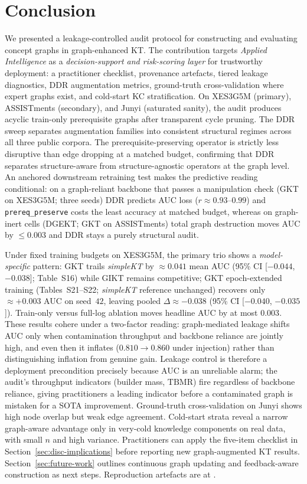 \documentclass[pdflatex,sn-mathphys-num]{sn-jnl}
\newcommand{\KCs}{knowledge components}
\newcommand{\DDR}{\textsc{DDR}}
\newcommand{\GKTdeltaci}{[$-0.044$, $-0.038$]}
\newcommand{\GKTthirtydeltavec}{-0.038}
\newcommand{\GKTthirtydeltaci}{[$-0.040$, $-0.035$]}
\newcommand{\GKTepochgain}{+0.003}
\begin{document}
\section{Conclusion}
\label{sec:concl}
We presented a leakage-controlled audit protocol for constructing and
evaluating concept graphs in graph-enhanced KT. The contribution targets
\textit{Applied Intelligence} as a \emph{decision-support and risk-scoring
layer} for trustworthy deployment: a
practitioner checklist, provenance artefacts, tiered leakage diagnostics,
\DDR{} augmentation metrics, ground-truth cross-validation where expert graphs
exist, and cold-start KC stratification. On XES3G5M (primary), ASSISTments (secondary), and Junyi (saturated sanity),
the audit produces acyclic train-only prerequisite graphs after transparent
cycle pruning. The \DDR{} sweep separates augmentation families into
consistent structural regimes across all three public corpora. The
prerequisite-preserving operator is strictly less disruptive than edge dropping
at a matched budget, confirming that \DDR{} separates structure-aware from
structure-agnostic operators at the graph level. An anchored downstream
retraining test makes the predictive reading conditional: on a graph-reliant
backbone that passes a manipulation check (GKT on XES3G5M; three seeds) \DDR{} predicts AUC
loss ($r{\approx}0.93$--$0.99$) and \texttt{prereq\_preserve} costs the least accuracy at
matched budget, whereas on graph-inert cells (DGEKT; GKT on ASSISTments) total
graph destruction moves AUC by ${\le}0.003$ and \DDR{} stays a purely
structural audit.

Under fixed training budgets on XES3G5M, the primary trio shows a
\emph{model-specific} pattern: GKT trails \textit{simpleKT} by
${\approx}0.041$ mean AUC (95\% CI \GKTdeltaci{}; Table~S16) while GIKT
remains competitive; GKT epoch-extended training (Tables~S21--S22;
\textit{simpleKT} reference unchanged) recovers only
${\approx}\GKTepochgain{}$ AUC on seed~$42$, leaving pooled
$\Delta{\approx}\GKTthirtydeltavec{}$ (95\% CI \GKTthirtydeltaci{}). Train-only versus
full-log ablation moves headline AUC by at most $0.003$. These results cohere
under a two-factor reading: graph-mediated leakage shifts AUC only when
contamination throughput and backbone reliance are jointly high, and even then
it inflates ($0.810{\to}0.860$ under injection) rather than distinguishing
inflation from genuine gain. Leakage control is therefore a deployment
precondition precisely because AUC is an unreliable alarm; the audit's
throughput indicators (builder mass, $\mathrm{TBMR}$) fire regardless of
backbone reliance, giving practitioners a leading indicator before a
contaminated graph is mistaken for a SOTA improvement. Ground-truth
cross-validation on Junyi shows high node overlap but weak edge agreement.
Cold-start strata reveal a narrow graph-aware advantage only in very-cold
\KCs{} on real data, with small $n$ and high variance. Practitioners can apply
the five-item checklist in Section~\ref{sec:disc-implications} before
reporting new graph-augmented KT results. Section~\ref{sec:future-work}
outlines continuous graph updating and feedback-aware construction as next
steps.
Reproduction artefacts are at
.
\end{document}
